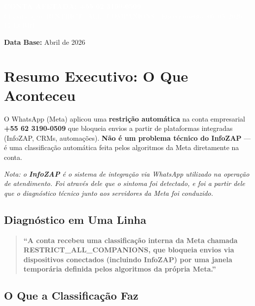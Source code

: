 \documentclass[12pt, a4paper]{article}
\begin{document}
\begin{titlepage}
    \colorbox{accentColor}{%
        \parbox{0.9\textwidth}{%
            \centering
            \vspace{0.6cm}
            \textcolor{white}{\Large \textbf{CONTA AFETADA: +55 62 3190-0509}} \\
            \vspace{0.2cm}
            \textcolor{white}{\normalsize Classificação: RESTRICT\_ALL\_COMPANIONS | Encerramento: 06/05/2026 17:13 BRT} \\
            \vspace{0.6cm}
        }%
    }

    \vspace{0.2cm}
    \textbf{Data Base:} Abril de 2026
\end{titlepage}

\section{Resumo Executivo: O Que Aconteceu}

O WhatsApp (Meta) aplicou uma \textbf{restrição automática} na conta empresarial \textbf{+55 62 3190-0509} que bloqueia envios a partir de plataformas integradas (InfoZAP, CRMs, automações). \textbf{Não é um problema técnico do InfoZAP} --- é uma classificação automática feita pelos algoritmos da Meta diretamente na conta.

\textcolor{secondaryText}{\small \textit{Nota: o \textbf{InfoZAP} é o sistema de integração via WhatsApp utilizado na operação de atendimento. Foi através dele que o sintoma foi detectado, e foi a partir dele que o diagnóstico técnico junto aos servidores da Meta foi conduzido.}}

\subsection{Diagnóstico em Uma Linha}

\begin{quote}
\textcolor{primaryColor}{\textbf{``A conta recebeu uma classificação interna da Meta chamada RESTRICT\_ALL\_COMPANIONS, que bloqueia envios via dispositivos conectados (incluindo InfoZAP) por uma janela temporária definida pelos algoritmos da própria Meta.''}}
\end{quote}

\subsection{O Que a Classificação Faz}
\end{document}
